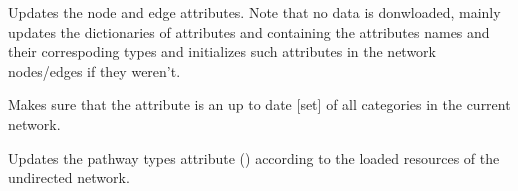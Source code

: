 \documentclass[letterpaper,10pt,english]{sphinxmanual}
\begin{document}
\begin{fulllineitems}
\begin{fulllineitems}
\label{\detokenize{reference:pypath.main.PyPath.update_attrs}}
Updates the node and edge attributes. Note that no data is
donwloaded, mainly updates the dictionaries of attributes
 and
 containing the
attributes names and their correspoding types and initializes
such attributes in the network nodes/edges if they weren’t.

\end{fulllineitems}


\begin{fulllineitems}
\label{\detokenize{reference:pypath.main.PyPath.update_cats}}
Makes sure that the 
attribute is an up to date {[}set{]} of all categories in the
current network.

\end{fulllineitems}


\begin{fulllineitems}
\label{\detokenize{reference:pypath.main.PyPath.update_db_dict}}
\end{fulllineitems}


\begin{fulllineitems}
\label{\detokenize{reference:pypath.main.PyPath.update_pathway_types}}
Updates the pathway types attribute
() according to the
loaded resources of the undirected network.

\end{fulllineitems}



\end{fulllineitems}
\end{document}
